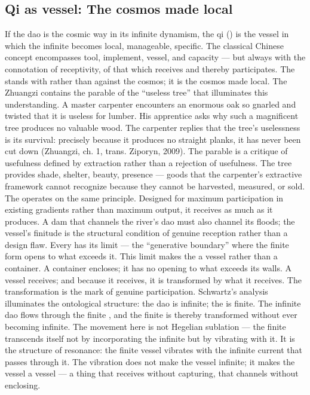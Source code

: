 \subsection{Qi as vessel: The cosmos made local}

If the dao is the cosmic way in its infinite dynamism, the qi () is the vessel in which the infinite becomes local, manageable, specific. The classical Chinese concept encompasses tool, implement, vessel, and capacity — but always with the connotation of receptivity, of that which receives and thereby participates. The  stands with rather than against the cosmos; it is the cosmos made local. The Zhuangzi contains the parable of the “useless tree” that illuminates this understanding. A master carpenter encounters an enormous oak so gnarled and twisted that it is useless for lumber. His apprentice asks why such a magnificent tree produces no valuable wood. The carpenter replies that the tree’s uselessness is its survival: precisely because it produces no straight planks, it has never been cut down (Zhuangzi, ch. 1, trans. Ziporyn, 2009). The parable is a critique of usefulness defined by extraction rather than a rejection of usefulness. The tree provides shade, shelter, beauty, presence — goods that the carpenter’s extractive framework cannot recognize because they cannot be harvested, measured, or sold. The  operates on the same principle. Designed for maximum participation in existing gradients rather than maximum output, it receives as much as it produces. A dam that channels the river’s dao must also channel its floods; the vessel’s finitude is the structural condition of genuine reception rather than a design flaw. Every  has its limit — the “generative boundary” where the finite form opens to what exceeds it. This limit makes the  a vessel rather than a container. A container encloses; it has no opening to what exceeds its walls. A vessel receives; and because it receives, it is transformed by what it receives. The transformation is the mark of genuine participation. Schwartz’s analysis illuminates the ontological structure: the dao is infinite; the  is finite. The infinite dao flows through the finite , and the finite  is thereby transformed without ever becoming infinite. The movement here is not Hegelian sublation — the finite transcends itself not by incorporating the infinite but by vibrating with it. It is the structure of resonance: the finite vessel vibrates with the infinite current that passes through it. The vibration does not make the vessel infinite; it makes the vessel a vessel — a thing that receives without capturing, that channels without enclosing.

